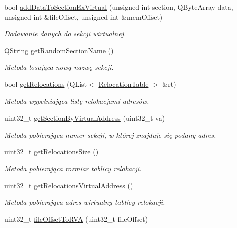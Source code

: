 \begin{DoxyCompactItemize}
bool \hyperlink{class_p_e_file_a02637152fe9ad85d48b25a8b8065a141}{add\-Data\-To\-Section\-Ex\-Virtual} (unsigned int section, Q\-Byte\-Array data, unsigned int \&file\-Offset, unsigned int \&mem\-Offset)
\begin{DoxyCompactList}\small\item\em Dodawanie danych do sekcji wirtualnej. \end{DoxyCompactList}\item 
Q\-String \hyperlink{class_p_e_file_aaaa99ad42e736cbfa9ecd48015cf1b42}{get\-Random\-Section\-Name} ()
\begin{DoxyCompactList}\small\item\em Metoda losująca nową nazwę sekcji. \end{DoxyCompactList}\item 
bool \hyperlink{class_p_e_file_a4eea22c0e10b83bb7bc1992ddca0ed01}{get\-Relocations} (Q\-List$<$ \hyperlink{struct_p_e_file_1_1_relocation_table}{Relocation\-Table} $>$ \&rt)
\begin{DoxyCompactList}\small\item\em Metoda wypełniająca listę relokacjami adresów. \end{DoxyCompactList}\item 
uint32\-\_\-t \hyperlink{class_p_e_file_a6ac76bef1134ab12de6638e9587533e7}{get\-Section\-By\-Virtual\-Address} (uint32\-\_\-t va)
\begin{DoxyCompactList}\small\item\em Metoda pobierająca numer sekcji, w której znajduje się podany adres. \end{DoxyCompactList}\item 
uint32\-\_\-t \hyperlink{class_p_e_file_a1a73ab27e218aa395293d05ea77e1b8e}{get\-Relocations\-Size} ()
\begin{DoxyCompactList}\small\item\em Metoda pobierająca rozmiar tablicy relokacji. \end{DoxyCompactList}\item 
uint32\-\_\-t \hyperlink{class_p_e_file_a2fe6323c5c4551acedf9ea2897ed3475}{get\-Relocations\-Virtual\-Address} ()
\begin{DoxyCompactList}\small\item\em Metoda pobierająca adres wirtualny tablicy relokacji. \end{DoxyCompactList}\item 
uint32\-\_\-t \hyperlink{class_p_e_file_aff48a73683e8409a75b0f3a3746a26db}{file\-Offset\-To\-R\-V\-A} (uint32\-\_\-t file\-Offset)

\end{DoxyCompactItemize}
